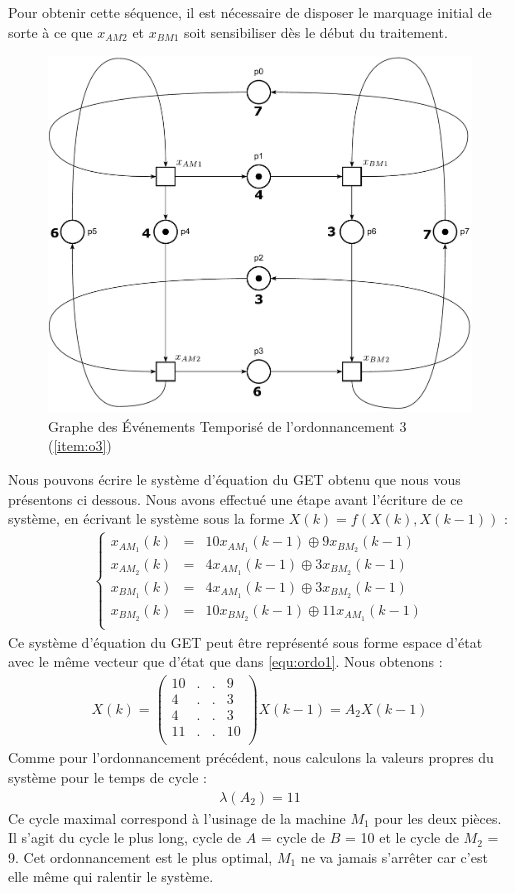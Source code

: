 Pour obtenir cette séquence, il est nécessaire de disposer le marquage initial de sorte à ce que $x_{AM2}$ et $x_{BM1}$ soit sensibiliser dès le début du traitement.
\begin{figure}[!ht]
\centering
\includegraphics[width = .75\textwidth]{./II/images/GET_3.pdf}
\caption{\label{fig:get} Graphe des Événements Temporisé de l'ordonnancement 3 (\ref{item:o3})}
\end{figure}

Nous pouvons écrire le système d'équation du GET obtenu que nous vous présentons ci dessous. Nous avons effectué une étape avant l'écriture de ce système, en écrivant le système sous la forme $X(k)=f(X(k),X(k-1))$ :
\begin{align*}%
\left\lbrace
\begin{array}{lcl}
x_{AM_1}(k)&=& 10x_{AM_1}(k-1) \oplus  9x_{BM_2}(k-1)\\
x_{AM_2}(k)&=&  4x_{AM_1}(k-1) \oplus  3x_{BM_2}(k-1)\\
x_{BM_1}(k)&=&  4x_{AM_1}(k-1) \oplus  3x_{BM_2}(k-1)\\
x_{BM_2}(k)&=& 10x_{BM_2}(k-1) \oplus 11x_{AM_1}(k-1)\\
\end{array}
\right.
\end{align*}
Ce système d'équation du GET peut être représenté sous forme espace d'état avec le même vecteur que d'état que dans \ref{equ:ordo1}. Nous obtenons :
\begin{align}\label{eqn:eeOrdo3}
X(k) = \begin{pmatrix}
10 & . &. & 9\\
4 &. &. & 3\\
4 &. &. & 3\\
11 &. &. & 10\\
\end{pmatrix}X(k-1) = A_2X(k-1)
\end{align} 
Comme pour l'ordonnancement précédent, nous calculons la valeurs propres du système pour le temps de cycle : 
\begin{eqnarray*}
\lambda(A_2) = 11  
\end{eqnarray*}
Ce cycle maximal correspond à l'usinage de la machine $M_1$ pour les deux pièces. Il s'agit du cycle le plus long, cycle de $A$ = cycle de $B$ = 10 et le cycle de $M_2$ = 9. Cet ordonnancement est le plus optimal, $M_1$ ne va jamais s'arrêter car c'est elle même qui ralentir le système. 
